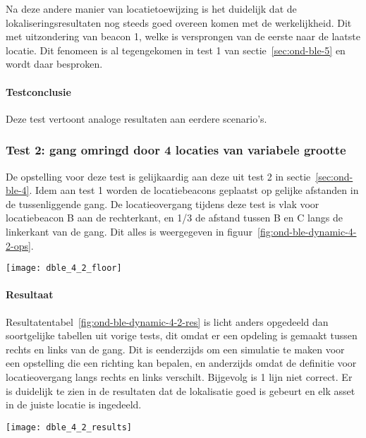 Na deze andere manier van locatietoewijzing is het duidelijk dat de lokaliseringsresultaten nog steeds goed overeen komen met de werkelijkheid. Dit met uitzondering van beacon 1, welke is versprongen van de eerste naar de laatste locatie. Dit fenomeen is al tegengekomen in test 1 van sectie~\ref{sec:ond-ble-5} en wordt daar besproken.

\paragraph{Testconclusie}
Deze test vertoont analoge resultaten aan eerdere scenario's.

\subsubsection{Test 2: gang omringd door 4 locaties van variabele grootte}
\label{sec:ond-ble-8-2}
\begin{minipage}{0.55\textwidth}
De opstelling voor deze test is gelijkaardig aan deze uit test 2 in sectie~\ref{sec:ond-ble-4}. Idem aan test 1 worden de locatiebeacons geplaatst op gelijke afstanden in de tussenliggende gang. De locatieovergang tijdens deze test is vlak voor locatiebeacon B aan de rechterkant, en 1/3 de afstand tussen B en C langs de linkerkant van de gang.  Dit alles is weergegeven in figuur~\ref{fig:ond-ble-dynamic-4-2-ops}.
\end{minipage}
\hfill
\begin{minipage}{0.42\textwidth}
	\texttt{[image: dble\_4\_2\_floor]}
	\label{fig:ond-ble-dynamic-4-2-ops}
\end{minipage}

\paragraph{Resultaat}
\begin{minipage}{0.42\textwidth}
Resultatentabel~\ref{fig:ond-ble-dynamic-4-2-res} is licht anders opgedeeld dan soortgelijke tabellen uit vorige tests, dit omdat er een opdeling is gemaakt tussen rechts en links van de gang. Dit is eenderzijds om een simulatie te maken voor een opstelling die een richting kan bepalen, en anderzijds omdat de definitie voor locatieovergang langs rechts en links verschilt. Bijgevolg is 1 lijn niet correct.
Er is duidelijk te zien in de resultaten dat de lokalisatie goed is gebeurt en elk asset in de juiste locatie is ingedeeld.
\end{minipage}
\hfill
\begin{minipage}{0.55\textwidth}
	\texttt{[image: dble\_4\_2\_results]}
	\label{fig:ond-ble-dynamic-4-2-res}
\end{minipage}

